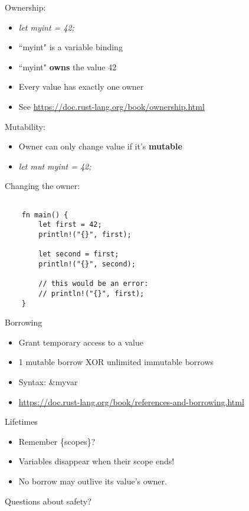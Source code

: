 \documentclass[aspectratio=169]{beamer}
\begin{document}
\begin{frame}
    Ownership:
    \begin{itemize}
        \item \textit{let myint = 42;}
        \item ``myint" is a variable binding
        \item ``myint" \textbf{owns} the value 42
        \item Every value has exactly one owner
        \item See \url{https://doc.rust-lang.org/book/ownership.html}
    \end{itemize}
\end{frame}

\begin{frame}
    Mutability:
    \begin{itemize}
        \item Owner can only change value if it's \textbf{mutable}
        \item \textit{let mut myint = 42;}
    \end{itemize}
\end{frame}

\begin{frame}[fragile]
    Changing the owner:
\begin{verbatim}

    fn main() {
        let first = 42;
        println!("{}", first);

        let second = first;
        println!("{}", second);

        // this would be an error:
        // println!("{}", first);
    }

\end{verbatim}

\end{frame}

\begin{frame}
    Borrowing
    \begin{itemize}
        \item Grant temporary access to a value
        \item 1 mutable borrow XOR unlimited immutable borrows
        \item Syntax: \&myvar
        \item \url{https://doc.rust-lang.org/book/references-and-borrowing.html}
    \end{itemize}
\end{frame}

\begin{frame}
    Lifetimes
    \begin{itemize}
        \item Remember \{scopes\}?
        \item Variables disappear when their scope ends!
        \item No borrow may outlive its value's owner.
    \end{itemize}
\end{frame}
\begin{frame}
    \hfill Questions about safety?
\end{frame}
\end{document}
